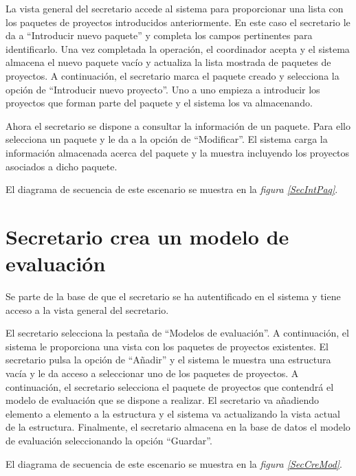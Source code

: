 \documentclass[11pt,a4paper,spanish,twoside]{book}
\begin{document}
La vista general del secretario accede al sistema para proporcionar una
lista con los paquetes de proyectos introducidos anteriormente. En este caso
el secretario le da a ``Introducir nuevo paquete'' y completa los campos
pertinentes para identificarlo. Una vez completada la operación, el
coordinador acepta y el sistema almacena el nuevo paquete vacío y actualiza
la lista mostrada de paquetes de proyectos. A continuación, el secretario
marca el paquete creado y selecciona la opción de ``Introducir nuevo 
proyecto''. Uno a uno empieza a introducir los proyectos que forman parte del
paquete y el sistema los va almacenando.

Ahora el secretario se dispone a consultar la información de un paquete.
Para ello selecciona un paquete y le da a la opción de ``Modificar''. El
sistema carga la información almacenada acerca del paquete y la muestra
incluyendo los proyectos asociados a dicho paquete.

El diagrama de secuencia de este escenario se muestra en la \emph{figura
\ref{SecIntPaq}}.


\section{Secretario crea un modelo de evaluación}
Se parte de la base de que el secretario se ha autentificado en el sistema y
tiene acceso a la vista general del secretario.

El secretario selecciona la pestaña de ``Modelos de evaluación''. A
continuación, el sistema le proporciona una vista con los paquetes de
proyectos existentes. El secretario pulsa la opción de ``Añadir'' y el sistema
le muestra una estructura vacía y le da acceso a seleccionar uno de los
paquetes de proyectos. A continuación, el secretario selecciona el paquete de
proyectos que contendrá el modelo de evaluación que se dispone a realizar.
El secretario va añadiendo elemento a elemento a la estructura y el sistema
va actualizando la vista actual de la estructura. Finalmente, el secretario
almacena en la base de datos el modelo de evaluación seleccionando la opción
``Guardar''.

El diagrama de secuencia de este escenario se muestra en la \emph{figura
\ref{SecCreMod}}.

\end{document}
